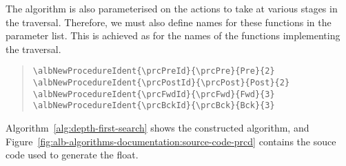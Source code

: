 \documentclass[11pt,a4paper,oneside,titlepage]{alb-corp}
\begin{document}
The algorithm is also parameterised on the actions to take at various
stages in the traversal.  Therefore, we must also define names for these
functions in the parameter list.  This is achieved as for the names of
the functions implementing the traversal.

\begin{quote}
\begin{verbatim}
\albNewProcedureIdent{\prcPreId}{\prcPre}{Pre}{2}
\albNewProcedureIdent{\prcPostId}{\prcPost}{Post}{2}
\albNewProcedureIdent{\prcFwdId}{\prcFwd}{Fwd}{3}
\albNewProcedureIdent{\prcBckId}{\prcBck}{Bck}{3}
\end{verbatim}
\end{quote}


Algorithm~\ref{alg:depth-first-search} shows the constructed algorithm,
and Figure~\ref{fig:alb-algorithms-documentation:source-code-prcd}
contains the souce code used to generate the float.
\end{document}
